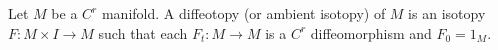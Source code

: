 Let $M$ be a $C^r$ manifold. A diffeotopy (or ambient isotopy) of $M$ is an isotopy $F: M \times I \to M$ such that each $F_t: M \to M$ is a $C^r$ diffeomorphism and $F_0 = 1_M$.
